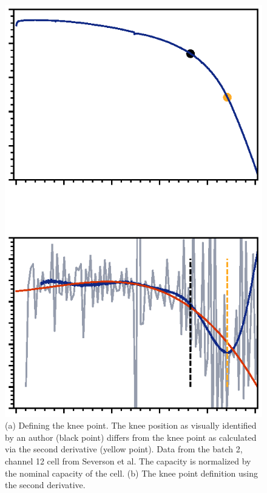 \documentclass[journal=jpclcd,manuscript=article]{achemso}
\begin{document}
\begin{figure}[!ht]
\centering
\includegraphics[scale=1]{figures/knee_definition.eps}
\caption{(a) Defining the knee point. The knee position as visually identified by an author (black point) differs from the knee point as calculated via the second derivative (yellow point). Data from the batch 2, channel 12 cell from Severson et al.\cite{severson_data-driven_2019} The capacity is normalized by the nominal capacity of the cell. %
(b) The knee point definition using the second derivative.}
\label{fig:knee_definition3}
\end{figure}
\end{document}
